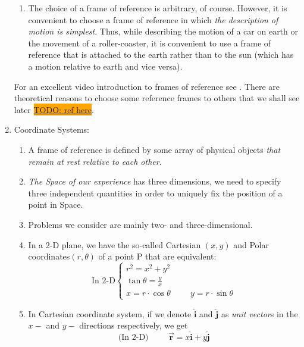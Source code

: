 \documentclass[12pt,a4paper]{book}
\newcommand\TODO[1]{\colorbox{orange}{\underline{\tiny{TODO: #1}}}}
\newcommand{\vect}[1]{\pmb{\vec{#1}}}
\newcommand{\uvec}[1]{\pmb{\hat{#1}}}
\begin{document}
\begin{enumerate}
\begin{enumerate}
            \item The choice of a frame of reference is arbitrary, of course. However, it is convenient to choose a frame of reference in which \emph{the description of motion is simplest}. Thus, while describing the motion of a car on earth or the movement of a roller-coaster, it is convenient to use a frame of reference that is attached to the earth rather than to the sun (which has a motion relative to earth and vice versa).
        \end{enumerate}
        For an excellent video introduction to frames of reference see \cite{pssc-for}. There are theoretical reasons to choose some reference frames to others that we shall see later \TODO{ref here}.
    \item Coordinate Systems:
        \begin{enumerate}
            \item A frame of reference is defined by some array of physical objects \emph{that remain at rest relative to each other}.
            \item \emph{The Space of our experience} has three dimensions, we need to specify three independent quantities in order to uniquely fix the position of a point in Space.
            \item Problems we consider are mainly two- and three-dimensional.
            \item In a 2-D plane, we have the so-called Cartesian $(x, y)$ and Polar coordinates$(r, \theta)$ of a point P that are equivalent:
                \begin{equation}
                    \label{eqn: 2-d-coordinates}
                    \mbox{In 2-D}
                    \begin{cases}
                        r^2 = x^2 + y^2 \\
                        \tan{\theta} = \frac{y}{x} \\
                        x = r\cdot \cos{\theta} \hspace{1cm} y = r\cdot \sin{\theta}
                    \end{cases}
                \end{equation}
            \item In Cartesian coordinate system, if we denote $\uvec{i}$ and $\uvec{j}$ as \emph{unit vector}s in the $x-$ and $y-$ directions respectively, we get
                \begin{equation}
                    \label{eqn: vector-addition-cartesian}
                    \mbox{(In 2-D)}\hspace{1cm} \vect{r} = x\uvec{i} + y\uvec{j}

\end{equation}
\end{enumerate}
\end{enumerate}
\end{document}
